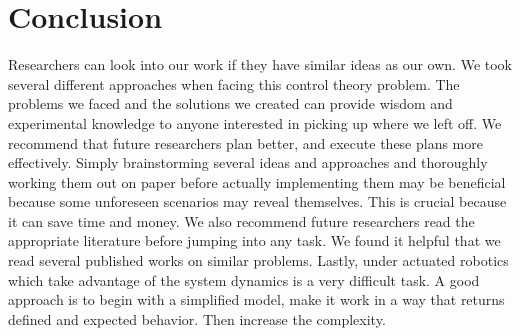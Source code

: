 \section{Conclusion}
Researchers can look into our work if they have similar ideas as our own. We took several different approaches when facing this control theory problem. The problems we faced and the solutions we created can provide wisdom and experimental knowledge to anyone interested in picking up where we left off. We recommend that future researchers plan better, and execute these plans more effectively. Simply brainstorming several ideas and approaches and thoroughly working them out on paper before actually implementing them may be beneficial because some unforeseen scenarios may reveal themselves. This is crucial because it can save time and money. We also recommend future researchers read the appropriate literature before jumping into any task. We found it helpful that we read several published works on similar problems. Lastly, under actuated robotics which take advantage of the system dynamics is a very difficult task. A good approach is to begin with a simplified model, make it work in a way that returns defined and expected behavior. Then increase the complexity.





\newpage

